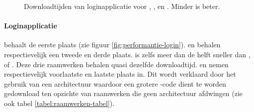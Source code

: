 \begin{figure}
  \centering
  \quad
  \caption{Downloadtijden van loginapplicatie voor \st{}, \kendo{},  \jqm{} en \lungo{}. Minder is beter.}
  \label{fig:performantie-login-boxplot}
\end{figure}

\paragraph{Loginapplicatie}
\lungo{} behaalt de eerste plaats (zie figuur \ref{fig:performantie-login}).
\jqm{} en \kendo{} behalen respectievelijk een tweede en derde plaats.
\lungo{} is zelfs meer dan de helft sneller dan \jqm{}, \kendo{} of \st{}.
Deze drie raamwerken behalen quasi dezelfde downloadtijd.
\kendo{} en \st{} nemen respectievelijk voorlaatste en laatste plaats in.
Dit wordt verklaard door het gebruik van een architectuur waardoor een grotere \js{}-code dient te worden gedownload ten opzichte van raamwerken die geen architectuur afdwingen (zie ook tabel \ref{tabel:raamwerken-tabel}).

